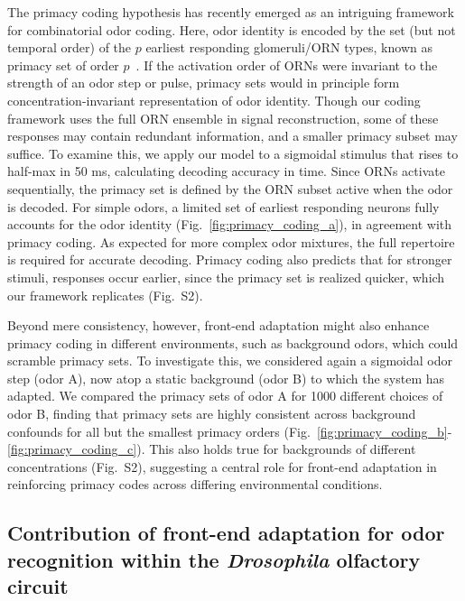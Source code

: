 \documentclass[9pt,twocolumn,twoside]{pnas-new}
\begin{document}
The primacy coding hypothesis has recently emerged as an intriguing framework for combinatorial odor coding. Here, odor identity is encoded by the set (but not temporal order) of the $p$ earliest responding glomeruli/ORN types, known as primacy set of order $p$~\cite{primacy_coding}. If the activation order of ORNs were invariant to the strength of an odor step or pulse, primacy sets would in principle form concentration-invariant representation of odor identity. Though our coding framework uses the full ORN ensemble in signal reconstruction, some of these responses may contain redundant information, and a smaller primacy subset may suffice. To examine this, we apply our model to a sigmoidal stimulus that rises to half-max in 50 ms, calculating decoding accuracy in time. Since ORNs activate sequentially, the primacy set is defined by the ORN subset active when the odor is decoded. For simple odors, a limited set of earliest responding neurons fully accounts for the odor identity (Fig.~\ref{fig:primacy_coding_a}), in agreement with primacy coding. As expected for more complex odor mixtures, the full repertoire is required for accurate decoding. Primacy coding also predicts that for stronger stimuli, responses occur earlier, since the primacy set is realized quicker, which our framework replicates (Fig.~S2).

Beyond mere consistency, however, front-end adaptation might also enhance primacy coding in different environments, such as background odors, which could scramble primacy sets. To investigate this, we considered again a sigmoidal odor step (odor A), now atop a static background (odor B) to which the system has adapted. We compared the primacy sets of odor A for 1000 different choices of odor B, finding that primacy sets are highly consistent across background confounds for all but the smallest primacy orders (Fig.~\ref{fig:primacy_coding_b}-\ref{fig:primacy_coding_c}). This also holds true for backgrounds of different concentrations (Fig.~S2), suggesting a central role for front-end adaptation in reinforcing primacy codes across differing environmental conditions. 


\subsection*{Contribution of front-end adaptation for odor recognition within the \textit{Drosophila} olfactory circuit}
\end{document}
